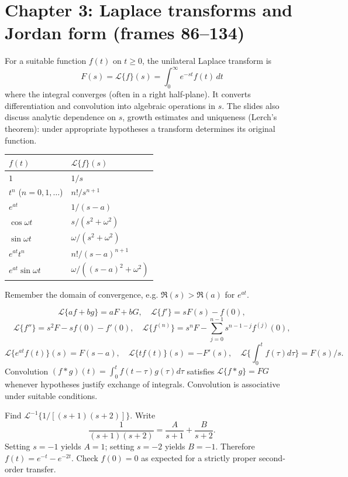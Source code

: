 \documentclass[10pt,a4paper]{article}
\newcommand{\Lap}{\mathcal{L}}\newcommand{\CC}{\mathbb{C}}\newcommand{\RR}{\mathbb{R}}
\begin{document}
\section{Chapter 3: Laplace transforms and Jordan form (frames 86--134)}

\begin{defbox}For a suitable function $f(t)$ on $t\ge0$, the unilateral Laplace transform is
\[\boxed{F(s)=\Lap\{f\}(s)=\int_0^\infty e^{-st}f(t)\,dt}\]
where the integral converges (often in a right half-plane). It converts differentiation and convolution into algebraic operations in $s$. The slides also discuss analytic dependence on $s$, growth estimates and uniqueness (Lerch's theorem): under appropriate hypotheses a transform determines its original function.
\end{defbox}
\begin{formbox}[title={TRANSFORM TABLE: MEMORISE AND RE-DERIVE}]
\begin{center}\begin{tabular}{@{}ll@{}}\toprule
$f(t)$&$\Lap\{f\}(s)$\\\midrule
$1$&$1/s$\\
$t^n$ ($n=0,1,\ldots$)&$n!/s^{n+1}$\\
$e^{at}$&$1/(s-a)$\\
$\cos\omega t$&$s/(s^2+\omega^2)$\\
$\sin\omega t$&$\omega/(s^2+\omega^2)$\\
$e^{at}t^n$&$n!/(s-a)^{n+1}$\\
$e^{at}\sin\omega t$&$\omega/((s-a)^2+\omega^2)$\\\bottomrule\end{tabular}\end{center}
Remember the domain of convergence, e.g. $\Re(s)>\Re(a)$ for $e^{at}$.
\end{formbox}
\begin{formbox}[title={RULES AND INITIAL VALUES}]
\[\Lap\{af+bg\}=aF+bG,\quad\Lap\{f'\}=sF(s)-f(0),\]
\[\Lap\{f''\}=s^2F-sf(0)-f'(0),\quad \Lap\{f^{(n)}\}=s^nF-\sum_{j=0}^{n-1}s^{n-1-j}f^{(j)}(0),\]
\[\Lap\{e^{at}f(t)\}(s)=F(s-a),\quad\Lap\{tf(t)\}(s)=-F'(s),\quad \Lap\{\int_0^t f(\tau)d\tau\}=F(s)/s.\]
Convolution $ (f*g)(t)=\int_0^t f(t-\tau)g(\tau)d\tau$ satisfies $\Lap\{f*g\}=FG$ whenever hypotheses justify exchange of integrals. Convolution is associative under suitable conditions.
\end{formbox}
\begin{workbox}[title={WORKED: inverse transform by partial fractions}]
Find $\Lap^{-1}\{1/[(s+1)(s+2)]\}$. Write
\[\frac1{(s+1)(s+2)}=\frac A{s+1}+\frac B{s+2}.\]
Setting $s=-1$ yields $A=1$; setting $s=-2$ yields $B=-1$. Therefore $\boxed{f(t)=e^{-t}-e^{-2t}}$. Check $f(0)=0$ as expected for a strictly proper second-order transfer.
\end{workbox}
\end{document}
